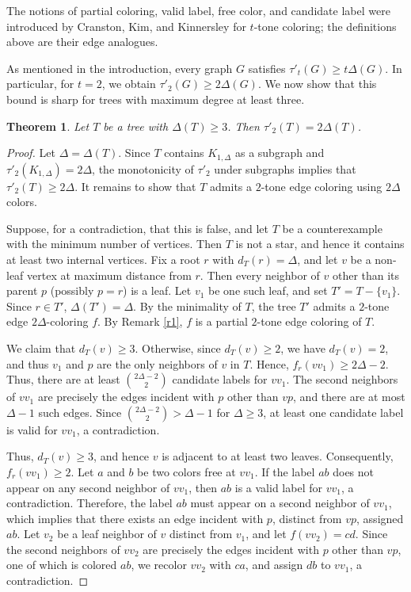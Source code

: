 \documentclass[12pt]{article}
\theoremstyle{plain}
\newtheorem{theorem}{Theorem}
\numberwithin{theorem}{section}
\numberwithin{conjecture}{section}
\numberwithin{corollary}{section}
\numberwithin{example}{section}
\numberwithin{lemma}{section}
\numberwithin{proposition}{section}
\numberwithin{problem}{section}
\numberwithin{remark}{section}
\numberwithin{claim}{theorem}
\numberwithin{definition}{section}
\begin{document}
The notions of partial coloring, valid label, free color, and candidate label were introduced by Cranston, Kim, and Kinnersley \cite{C1} for $t$-tone coloring; the definitions above are their edge analogues.

As mentioned in the introduction, every graph $G$ satisfies $\tau'_t(G)\ge t\Delta(G)$. In particular, for $t=2$, we obtain $\tau'_2(G)\ge 2\Delta(G)$. We now show that this bound is sharp for trees with maximum degree at least three.

\begin{theorem}
Let $T$ be a tree with $\Delta(T)\ge 3$. Then $\tau'_2(T)=2\Delta(T)$.
\end{theorem}

\begin{proof}
Let $\Delta=\Delta(T)$. Since $T$ contains $K_{1,\Delta}$ as a subgraph and $\tau'_2(K_{1,\Delta})=2\Delta$, the monotonicity of $\tau'_2$ under subgraphs implies that $\tau'_2(T)\ge 2\Delta$. It remains to show that $T$ admits a $2$-tone edge coloring using $2\Delta$ colors.

\noindent Suppose, for a contradiction, that this is false, and let $T$ be a counterexample with the minimum number of vertices. Then $T$ is not a star, and hence it contains at least two internal vertices. Fix a root $r$ with $d_T(r)=\Delta$, and let $v$ be a non-leaf vertex at maximum distance from $r$. Then every neighbor of $v$ other than its parent $p$ (possibly $p=r$) is a leaf. Let $v_1$ be one such leaf, and set $T' = T - \{v_1\}$. Since $r \in T'$, $\Delta(T')=\Delta$. By the minimality of $T$, the tree $T'$ admits a $2$-tone edge $2\Delta$-coloring $f$. By Remark \ref{r1}, $f$ is a partial $2$-tone edge coloring of $T$.

\noindent We claim that $d_T(v)\ge 3$. Otherwise, since $d_T(v)\ge 2$, we have $d_T(v)=2$, and thus $v_1$ and $p$ are the only neighbors of $v$ in $T$. Hence, $f_r(vv_1)\ge 2\Delta-2$. Thus, there are at least $\binom{2\Delta-2}{2}$ candidate labels for $vv_1$. The second neighbors of $vv_1$ are precisely the edges incident with $p$ other than $vp$, and there are at most $\Delta-1$ such edges. Since $\binom{2\Delta-2}{2} > \Delta-1$ for $\Delta \ge 3$, at least one candidate label is valid for $vv_1$, a contradiction.

\noindent Thus, $d_T(v)\ge 3$, and hence $v$ is adjacent to at least two leaves. Consequently, $f_r(vv_1)\ge2$. Let $a$ and $b$ be two colors free at $vv_1$. If the label $ab$ does not appear on any second neighbor of $vv_1$, then $ab$ is a valid label for $vv_1$, a contradiction. Therefore, the label $ab$ must appear on a second neighbor of $vv_1$, which implies that there exists an edge incident with $p$, distinct from $vp$, assigned $ab$. Let $v_2$ be a leaf neighbor of $v$ distinct from $v_1$, and let $f(vv_2)=cd$. Since the second neighbors of $vv_2$ are precisely the edges incident with $p$ other than $vp$, one of which is colored $ab$, we recolor $vv_2$ with $ca$, and assign $db$ to $vv_1$, a contradiction.\end{proof}
\end{document}

